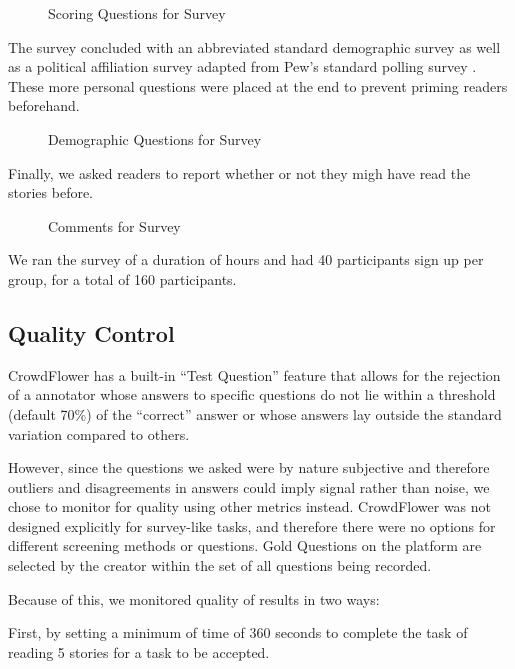\begin{figure}[H] 
\centering
  \caption{Scoring Questions for Survey}
\end{figure}

The survey concluded with an abbreviated standard demographic survey as well as a political affiliation survey adapted from Pew's standard polling survey \cite{Pew-demographics}. These more personal questions were placed at the end to prevent priming readers beforehand.


\begin{figure}[h!] 
\centering
  \caption{Demographic Questions for Survey}
\end{figure}

Finally, we asked readers to report whether or not they migh have read the stories before.

\begin{figure}[H] 
\centering
  \caption{Comments for Survey}
\end{figure}

We ran the survey of a duration of  hours and had 40 participants sign up per group, for a total of 160 participants.

\subsection{Quality Control}

CrowdFlower has a built-in ``Test Question'' feature that allows for the rejection of a annotator whose answers to specific questions do not lie within a threshold (default 70\%) of the ``correct'' answer or whose answers lay outside the standard variation compared to others.

However, since the questions we asked were by nature subjective and therefore outliers and disagreements in answers could imply signal rather than noise, we chose to monitor for quality using other metrics instead. CrowdFlower was not designed explicitly for survey-like tasks, and therefore there were no options for different screening methods or questions. Gold Questions on the platform are selected by the creator within the set of all questions being recorded.

Because of this, we monitored quality of results in two ways:

First, by setting a minimum of time of 360 seconds to complete the task of reading 5 stories for a task to be accepted.

